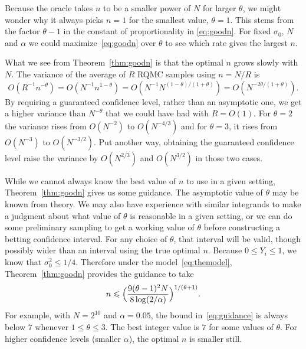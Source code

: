 \documentclass{article}
\newcommand{\art}[1]{\begingroup\color{blue}#1\endgroup}
\newcommand{\fred}[1]{\begingroup\color{red}#1\endgroup}
\renewcommand{\le}{\leqslant}
\begin{document}
Because the oracle takes $n$ to be a smaller
power of $N$ for larger $\theta$, we might
wonder why it always picks $n=1$ for the smallest value, $\theta=1$. 
This stems from the factor $\theta-1$ in the constant of proportionality
in \eqref{eq:goodn}.
For fixed $\sigma_0$, $N$ and $\alpha$ we could 
maximize~\eqref{eq:goodn} over $\theta$
to see which rate gives the largest $n$.

What we see from Theorem~\ref{thm:goodn} is that the optimal
$n$ grows slowly with $N$. The variance of the average of $R$
RQMC samples using $n=N/R$ is
$$
O(R^{-1}n^{-\theta}) = O( N^{-1}n^{1-\theta})
= O( N^{-1}N^{(1-\theta)/(1+\theta)})
= O( N^{-2\theta/(1+\theta)}).
$$
By requiring a guaranteed confidence level\fred{, rather than an asymptotic one}, we
get a higher variance than $N^{-\theta}$
that we could have had with $R=O(1)$.
For $\theta=2$ the variance rises
from $O(N^{-2})$ to $O(N^{-4/3})$
and for $\theta=3$, it rises from
$O(N^{-3})$ to $O(N^{-3/2})$.
Put another way, obtaining the guaranteed confidence
level raise the variance by $O(N^{2/3})$
and $O(N^{3/2})$ in those two cases.

\art{While we cannot always know the best value of $n$ to use
in a given setting, Theorem~\ref{thm:goodn} gives us some guidance.
The asymptotic value of $\theta$ may be known from theory.
We may also have experience with similar integrands to make a
judgment about what value of $\theta$ is reasonable in a given
setting, or we can do some preliminary sampling to get a working
value of $\theta$ before constructing a betting confidence interval.
For any choice of $\theta$, that interval will be valid, though possibly 
wider than an interval using the true optimal $n$.
Because $0\le Y_i\le1$, we know that $\sigma_0^2\le 1/4$. Therefore
under the model~\eqref{eq:themodel}, Theorem~\ref{thm:goodn}
provides the guidance to take
\begin{align}\label{eq:guidance}
n\le \Bigl(\frac{9(\theta-1)^2N}{8\log(2/\alpha)}\Bigr)^{1/(\theta+1)}.
\end{align}
For example, with $N=2^{10}$ and $\alpha=0.05$, the bound in~\eqref{eq:guidance}
is always below $7$ whenever $1\le\theta\le3$. The best integer
value is $7$ for some values of $\theta$.
For higher confidence levels (smaller $\alpha$), the optimal
$n$ is smaller still.
}
\end{document}
